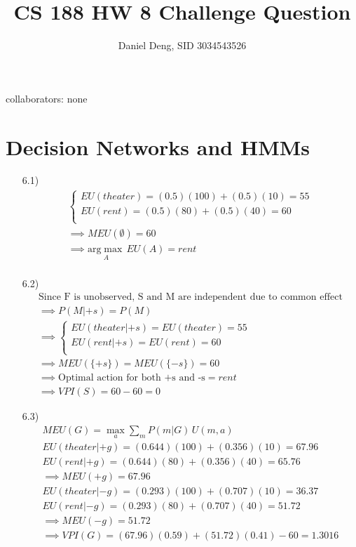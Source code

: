 \documentclass[11pt]{article}
\title{CS 188 HW 8 Challenge Question}
\author{Daniel Deng, SID 3034543526}
\date{}
\theoremstyle{definition}
\theoremstyle{remark}
\begin{document}
\maketitle

collaborators: none

\section{Decision Networks and HMMs}
\begin{enumerate}
\item[6.1)]
\begin{align*}
\begin{cases}
EU(theater) = (0.5)(100) + (0.5)(10) = 55 \\
EU(rent) = (0.5)(80) + (0.5)(40) = 60 \\
\end{cases} \\
\implies MEU(\emptyset) = 60 \\
\implies \underset{A}{\mathrm{arg}\!\max}\, EU(A) = rent \\
\end{align*}

\item[6.2)]
\begin{align*}
\text{Since F is unobserved, S and M are independent due to common effect} \\
\implies P(M|+s) = P(M) \\
\implies \begin{cases}
EU(theater|+s) = EU(theater) = 55 \\
EU(rent|+s) = EU(rent) = 60 \\
\end{cases} \\
\implies MEU(\{+s\}) = MEU(\{-s\})= 60 \\
\implies \text{Optimal action for both +s and -s} = rent \\
\implies VPI(S) = 60 -60 = 0
\end{align*}

\item[6.3)]
\begin{align*}
MEU(G) = \max_a \sum_{m} P(m|G)\,U(m,a)\\
EU(theater|+g) = (0.644)(100) + (0.356)(10) = 67.96 \\
EU(rent|+g) = (0.644)(80) + (0.356)(40) = 65.76 \\
\implies MEU(+g) = 67.96 \\
EU(theater|-g) = (0.293)(100) + (0.707)(10) = 36.37 \\
EU(rent|-g) = (0.293)(80)+(0.707)(40) = 51.72 \\
\implies MEU(-g) = 51.72 \\
\implies VPI(G) = (67.96)(0.59) + (51.72)(0.41) - 60 = 1.3016\\
\end{align*}


\end{enumerate}
\end{document}
